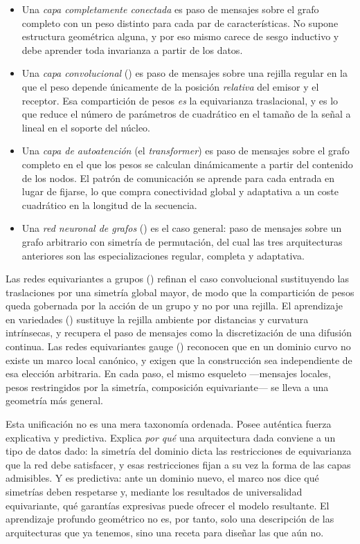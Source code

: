 \begin{itemize}
  \item Una \emph{capa completamente conectada} es paso de mensajes sobre el grafo
  completo con un peso distinto para cada par de caracter\'isticas. No supone
  estructura geom\'etrica alguna, y por eso mismo carece de sesgo inductivo y debe
  aprender toda invarianza a partir de los datos.
  \item Una \emph{capa convolucional} () es paso de mensajes sobre
  una rejilla regular en la que el peso depende \'unicamente de la posici\'on
  \emph{relativa} del emisor y el receptor. Esa compartici\'on de pesos \emph{es}
  la equivarianza traslacional, y es lo que reduce el n\'umero de par\'ametros de
  cuadr\'atico en el tama\~no de la se\~nal a lineal en el soporte del n\'ucleo.
  \item Una \emph{capa de autoatenci\'on} (el \emph{transformer}) es paso de
  mensajes sobre el grafo completo en el que los pesos se calculan din\'amicamente
  a partir del contenido de los nodos. El patr\'on de comunicaci\'on se aprende
  para cada entrada en lugar de fijarse, lo que compra conectividad global y
  adaptativa a un coste cuadr\'atico en la longitud de la secuencia.
  \item Una \emph{red neuronal de grafos} () es el caso general:
  paso de mensajes sobre un grafo arbitrario con simetr\'ia de permutaci\'on, del
  cual las tres arquitecturas anteriores son las especializaciones regular,
  completa y adaptativa.
\end{itemize}

Las redes equivariantes a grupos () refinan el caso convolucional
sustituyendo las traslaciones por una simetr\'ia global mayor, de modo que la
compartici\'on de pesos queda gobernada por la acci\'on de un grupo y no por una
rejilla. El aprendizaje en variedades () sustituye la rejilla
ambiente por distancias y curvatura intr\'insecas, y recupera el paso de mensajes
como la discretizaci\'on de una difusi\'on continua. Las redes equivariantes gauge
() reconocen que en un dominio curvo no existe un marco local
can\'onico, y exigen que la construcci\'on sea independiente de esa elecci\'on
arbitraria. En cada paso, el mismo esqueleto ---mensajes locales, pesos
restringidos por la simetr\'ia, composici\'on equivariante--- se lleva a una
geometr\'ia m\'as general.

Esta unificaci\'on no es una mera taxonom\'ia ordenada. Posee aut\'entica fuerza
explicativa y predictiva. Explica \emph{por qu\'e} una arquitectura dada conviene
a un tipo de datos dado: la simetr\'ia del dominio dicta las restricciones de
equivarianza que la red debe satisfacer, y esas restricciones fijan a su vez la
forma de las capas admisibles. Y es predictiva: ante un dominio nuevo, el marco
nos dice qu\'e simetr\'ias deben respetarse y, mediante los resultados de
universalidad equivariante, qu\'e garant\'ias expresivas puede ofrecer el modelo
resultante. El aprendizaje profundo geom\'etrico no es, por tanto, solo una
descripci\'on de las arquitecturas que ya tenemos, sino una receta para dise\~nar
las que a\'un no.

